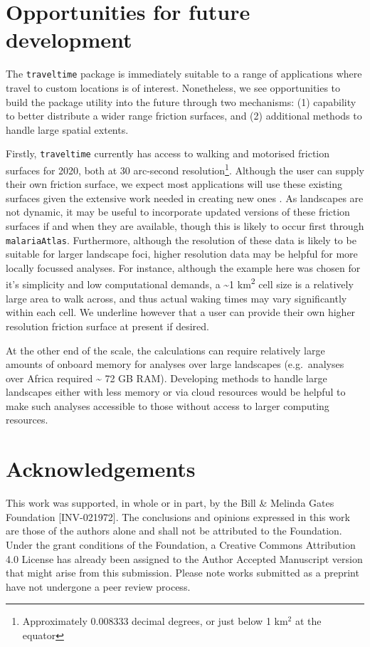 \documentclass[
  10pt,
  letterpaper,
]{article}
\begin{document}
\section{Opportunities for future
development}\label{opportunities-for-future-development}

The \texttt{traveltime} package is immediately suitable to a range of
applications where travel to custom locations is of interest.
Nonetheless, we see opportunities to build the package utility into the
future through two mechanisms: (1) capability to better distribute a
wider range friction surfaces, and (2) additional methods to handle
large spatial extents.

Firstly, \texttt{traveltime} currently has access to walking and
motorised friction surfaces for 2020, both at 30 arc-second
resolution\footnote{Approximately 0.008333 decimal degrees, or just
  below 1 km\(^2\) at the equator}. Although the user can supply their
own friction surface, we expect most applications will use these
existing surfaces given the extensive work needed in creating new ones
\citep{weiss2018global, weiss2020global}. As landscapes are not dynamic,
it may be useful to incorporate updated versions of these friction
surfaces if and when they are available, though this is likely to occur
first through \texttt{malariaAtlas}. Furthermore, although the
resolution of these data is likely to be suitable for larger landscape
foci, higher resolution data may be helpful for more locally focussed
analyses. For instance, although the example here was chosen for it's
simplicity and low computational demands, a \textasciitilde1
km\textsuperscript{2} cell size is a relatively large area to walk
across, and thus actual waking times may vary significantly within each
cell. We underline however that a user can provide their own higher
resolution friction surface at present if desired.

At the other end of the scale, the calculations can require relatively
large amounts of onboard memory for analyses over large landscapes
(e.g.~analyses over Africa required \textasciitilde{} 72 GB RAM).
Developing methods to handle large landscapes either with less memory or
via cloud resources would be helpful to make such analyses accessible to
those without access to larger computing resources.

\section{Acknowledgements}\label{acknowledgements}

This work was supported, in whole or in part, by the Bill \& Melinda
Gates Foundation {[}INV-021972{]}. The conclusions and opinions
expressed in this work are those of the authors alone and shall not be
attributed to the Foundation. Under the grant conditions of the
Foundation, a Creative Commons Attribution 4.0 License has already been
assigned to the Author Accepted Manuscript version that might arise from
this submission. Please note works submitted as a preprint have not
undergone a peer review process.


\nolinenumbers
\renewcommand\refname{References}
  
\end{document}
